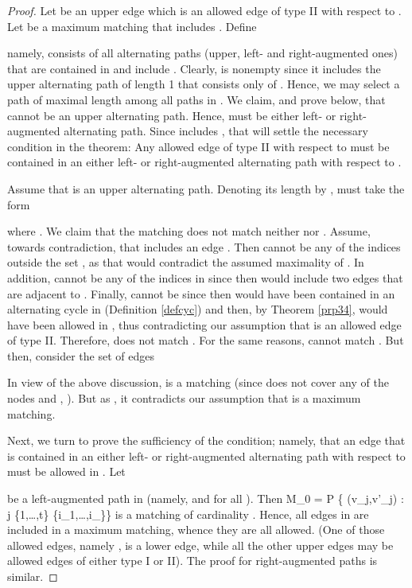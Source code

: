 \documentclass[times, 11pt]{article}
\newcommand{\be}{}
\begin{document}
\begin{proof} Let  be an upper edge which is an allowed edge of type II with respect to .
Let  be a maximum matching that includes . Define

namely,  consists of all alternating paths (upper, left- and right-augmented ones) that are contained in  and include .
Clearly,  is nonempty since it includes the upper alternating path of length 1 that consists only of .
Hence, we may select a path  of maximal length
among all paths in .
We claim, and prove below, that  cannot be an upper alternating path. Hence,  must be either left- or right-augmented alternating path.
Since  includes , that will settle the necessary condition in the theorem: Any allowed edge of type II with respect to  must be contained in
an either left- or right-augmented alternating path with respect to .

Assume that  is an upper alternating path. Denoting its length by ,  must take the form

where .
We claim that the matching  does not match neither  nor . Assume, towards contradiction, that  includes an edge .
Then  cannot be any of the indices outside the set , as that would contradict the assumed maximality of .
In addition,  cannot be any of the indices in  since then  would include two edges that are adjacent to .
Finally,  cannot be  since then  would have been contained in an alternating
cycle in  (Definition \ref{defcyc}) and then, by Theorem \ref{prp34},  would have been allowed in , thus contradicting our assumption that  is
an allowed edge of type II.
Therefore,  does not match . For the same reasons,  cannot match . But then, consider the set of edges

In view of the above discussion,  is a matching (since  does not cover any of the nodes  and , ). But as , it contradicts our assumption that  is a maximum matching.

Next, we turn to prove the sufficiency of the condition; namely, that an edge that is contained in an
either left- or right-augmented alternating path with respect to  must be allowed in . Let

be a left-augmented path in  (namely,  and  for all ). Then
\be M_0 = P \cup \{ (v_j,v'_j) : j \in \{1,\ldots,t\} \setminus \{i_1,\ldots,i_\ell\}\} \label{m0}\ee
is a matching of cardinality . Hence, all edges in  are included in a maximum matching, whence they are all allowed. (One of those allowed edges, namely
, is a lower edge, while all the other upper edges may be allowed edges of either type I or II). The proof for right-augmented paths is similar.
\end{proof}
\end{document}
